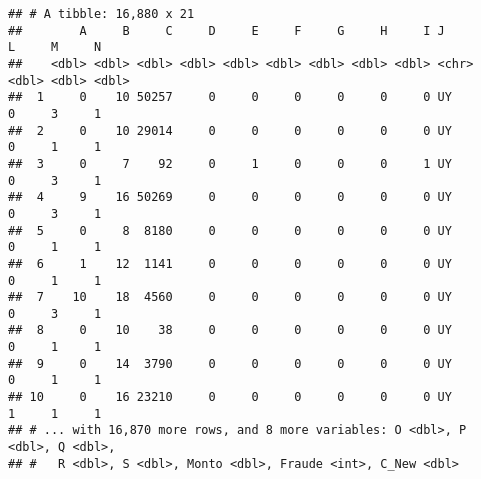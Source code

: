 \documentclass[]{article}
\begin{document}
\begin{verbatim}
## # A tibble: 16,880 x 21
##        A     B     C     D     E     F     G     H     I J         L     M     N
##    <dbl> <dbl> <dbl> <dbl> <dbl> <dbl> <dbl> <dbl> <dbl> <chr> <dbl> <dbl> <dbl>
##  1     0    10 50257     0     0     0     0     0     0 UY        0     3     1
##  2     0    10 29014     0     0     0     0     0     0 UY        0     1     1
##  3     0     7    92     0     1     0     0     0     1 UY        0     3     1
##  4     9    16 50269     0     0     0     0     0     0 UY        0     3     1
##  5     0     8  8180     0     0     0     0     0     0 UY        0     1     1
##  6     1    12  1141     0     0     0     0     0     0 UY        0     1     1
##  7    10    18  4560     0     0     0     0     0     0 UY        0     3     1
##  8     0    10    38     0     0     0     0     0     0 UY        0     1     1
##  9     0    14  3790     0     0     0     0     0     0 UY        0     1     1
## 10     0    16 23210     0     0     0     0     0     0 UY        1     1     1
## # ... with 16,870 more rows, and 8 more variables: O <dbl>, P <dbl>, Q <dbl>,
## #   R <dbl>, S <dbl>, Monto <dbl>, Fraude <int>, C_New <dbl>
\end{verbatim}
\end{document}

